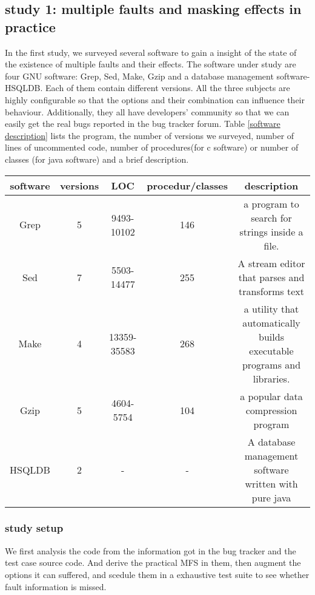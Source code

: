 \documentclass{sig-alternate}
\begin{document}
\subsection{study 1: multiple faults and masking effects in practice}
In the first study, we surveyed several software to gain a insight of the state of the existence of multiple faults and their effects. The software under study are four GNU software: Grep, Sed, Make, Gzip and a database management software- HSQLDB. Each of them contain different versions. All the three subjects are highly configurable so that the options and their combination can influence their behaviour. Additionally, they all have developers' community so that we can easily get the real bugs reported in the bug tracker forum. Table \ref{software description} lists the program, the number of versions we surveyed, number of lines of uncommented code, number of procedures(for c software) or number of classes (for java software) and a brief description.

\begin{table*}\renewcommand{\arraystretch}{1.3}
\caption{Software under survey}
\label{software description}
\begin{tabular}{c|c|c|c|c} \hline
software & versions & LOC & procedur/classes & description\\ \hline
Grep & 5 &  9493-10102 &146 &  a program to search for strings inside a file.\\ \hline
Sed & 7 & 5503-14477  & 255& A stream editor that parses and transforms text \\ \hline
Make & 4 &  13359-35583 &268&   a utility that automatically builds executable programs and libraries. \\ \hline
Gzip &5 &  4604-5754 &104&  a popular data compression program \\ \hline
HSQLDB &2 & - &-& A database management software written with pure java\\
\hline\end{tabular}
\end{table*}

\subsubsection{study setup}
We first analysis the code from the information got in the bug tracker and the test case source code. And derive the practical MFS in them, then augment the options it can suffered, and scedule them in a exhaustive test suite to see whether fault information is missed. 
\end{document}
